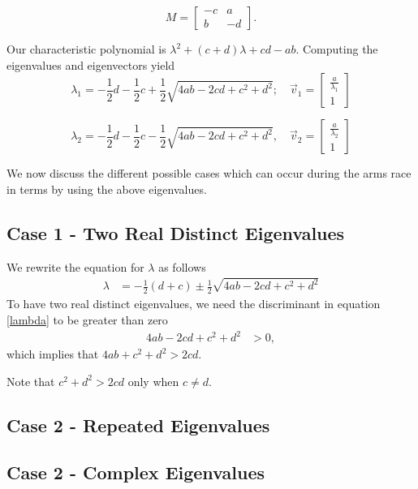 \[
M=
  \begin{bmatrix}
    -c & a\\ 
    b & -d
  \end{bmatrix}.
\]

Our characteristic polynomial is $\lambda^2 + (c+d)\lambda + cd - ab$. Computing the eigenvalues and eigenvectors yield
$$\lambda_1 = -\frac{1}{2}d - \frac{1}{2}c + \frac{1}{2}\sqrt{4ab -2cd + c^2 + d^2}; \quad \vec{v}_1 = 
	\begin{bmatrix}
	\frac{a}{\lambda_1}\\
	1
	\end{bmatrix}$$
	
$$\lambda_2 = -\frac{1}{2}d - \frac{1}{2}c - \frac{1}{2}\sqrt{4ab -2cd + c^2 + d^2}, \quad \vec{v}_2 = 
	\begin{bmatrix}
	\frac{a}{\lambda_2}\\
	1
	\end{bmatrix}$$	

We now discuss the different possible cases which can occur during the arms race in terms by using the above eigenvalues.
\subsection{Case 1 - Two Real Distinct Eigenvalues}

We rewrite the equation for $\lambda$ as follows
	\begin{align} \label{lambda}
	\lambda & = -\frac{1}{2}(d + c) \pm \frac{1}{2}\sqrt{4ab -2cd + c^2 + d^2}
	\end{align}
To have two real distinct eigenvalues, we need the discriminant in equation \eqref{lambda} to be greater than zero
	\begin{align} \label{discGreaterThanZero}
	4ab -2cd + c^2 + d^2 & > 0,
	\end{align}
which implies that $4ab + c^2 + d^2 > 2cd$. 

Note that $c^2 +d^2 > 2cd$ only when $c\ne d$. 

	

\subsection{Case 2 - Repeated Eigenvalues}
\subsection{Case 2 - Complex Eigenvalues}




